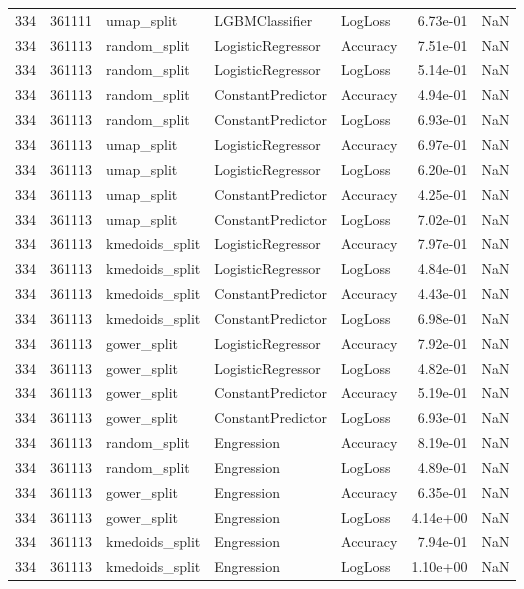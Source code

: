 \begin{tabular}{rrlllrr}
334 & 361111 & umap\_split & LGBMClassifier & LogLoss & 6.73e-01 & NaN \\
334 & 361113 & random\_split & LogisticRegressor & Accuracy & 7.51e-01 & NaN \\
334 & 361113 & random\_split & LogisticRegressor & LogLoss & 5.14e-01 & NaN \\
334 & 361113 & random\_split & ConstantPredictor & Accuracy & 4.94e-01 & NaN \\
334 & 361113 & random\_split & ConstantPredictor & LogLoss & 6.93e-01 & NaN \\
334 & 361113 & umap\_split & LogisticRegressor & Accuracy & 6.97e-01 & NaN \\
334 & 361113 & umap\_split & LogisticRegressor & LogLoss & 6.20e-01 & NaN \\
334 & 361113 & umap\_split & ConstantPredictor & Accuracy & 4.25e-01 & NaN \\
334 & 361113 & umap\_split & ConstantPredictor & LogLoss & 7.02e-01 & NaN \\
334 & 361113 & kmedoids\_split & LogisticRegressor & Accuracy & 7.97e-01 & NaN \\
334 & 361113 & kmedoids\_split & LogisticRegressor & LogLoss & 4.84e-01 & NaN \\
334 & 361113 & kmedoids\_split & ConstantPredictor & Accuracy & 4.43e-01 & NaN \\
334 & 361113 & kmedoids\_split & ConstantPredictor & LogLoss & 6.98e-01 & NaN \\
334 & 361113 & gower\_split & LogisticRegressor & Accuracy & 7.92e-01 & NaN \\
334 & 361113 & gower\_split & LogisticRegressor & LogLoss & 4.82e-01 & NaN \\
334 & 361113 & gower\_split & ConstantPredictor & Accuracy & 5.19e-01 & NaN \\
334 & 361113 & gower\_split & ConstantPredictor & LogLoss & 6.93e-01 & NaN \\
334 & 361113 & random\_split & Engression & Accuracy & 8.19e-01 & NaN \\
334 & 361113 & random\_split & Engression & LogLoss & 4.89e-01 & NaN \\
334 & 361113 & gower\_split & Engression & Accuracy & 6.35e-01 & NaN \\
334 & 361113 & gower\_split & Engression & LogLoss & 4.14e+00 & NaN \\
334 & 361113 & kmedoids\_split & Engression & Accuracy & 7.94e-01 & NaN \\
334 & 361113 & kmedoids\_split & Engression & LogLoss & 1.10e+00 & NaN \\

\end{tabular}

